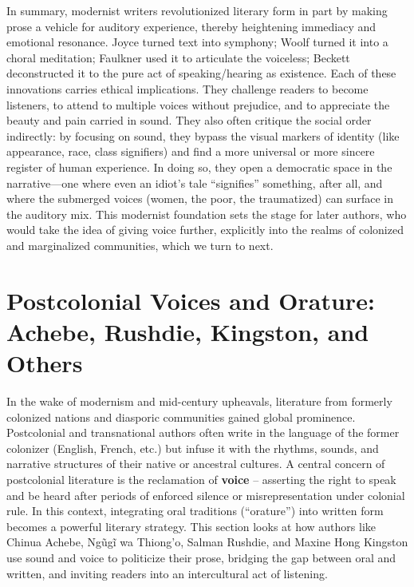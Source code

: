 \documentclass[12pt]{report}
\begin{document}
In summary, modernist writers revolutionized literary form in part by making prose a vehicle for auditory experience, thereby heightening immediacy and emotional resonance. Joyce turned text into symphony; Woolf turned it into a choral meditation; Faulkner used it to articulate the voiceless; Beckett deconstructed it to the pure act of speaking/hearing as existence. Each of these innovations carries ethical implications. They challenge readers to become listeners, to attend to multiple voices without prejudice, and to appreciate the beauty and pain carried in sound. They also often critique the social order indirectly: by focusing on sound, they bypass the visual markers of identity (like appearance, race, class signifiers) and find a more universal or more sincere register of human experience. In doing so, they open a democratic space in the narrative—one where even an idiot’s tale “signifies” something, after all, and where the submerged voices (women, the poor, the traumatized) can surface in the auditory mix. This modernist foundation sets the stage for later authors, who would take the idea of giving voice further, explicitly into the realms of colonized and marginalized communities, which we turn to next.

\section{Postcolonial Voices and Orature: Achebe, Rushdie, Kingston, and Others}
In the wake of modernism and mid-century upheavals, literature from formerly colonized nations and diasporic communities gained global prominence. Postcolonial and transnational authors often write in the language of the former colonizer (English, French, etc.) but infuse it with the rhythms, sounds, and narrative structures of their native or ancestral cultures. A central concern of postcolonial literature is the reclamation of \textbf{voice} – asserting the right to speak and be heard after periods of enforced silence or misrepresentation under colonial rule. In this context, integrating oral traditions (“orature”) into written form becomes a powerful literary strategy. This section looks at how authors like Chinua Achebe, Ngũgĩ wa Thiong’o, Salman Rushdie, and Maxine Hong Kingston use sound and voice to politicize their prose, bridging the gap between oral and written, and inviting readers into an intercultural act of listening.
\end{document}
